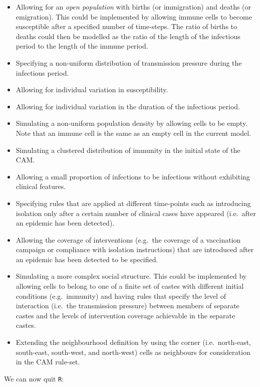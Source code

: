 \documentclass[12pt,a4paper]{book}
\theoremstyle{definition}
\theoremstyle{definition}
\theoremstyle{definition}
\theoremstyle{remark}
\begin{document}
\begin{itemize}
\item
  Allowing for an \emph{open population} with births (or immigration)
  and deaths (or emigration). This could be implemented by allowing
  immune cells to become susceptible after a specified number of
  time-steps. The ratio of births to deaths could then be modelled as
  the ratio of the length of the infectious period to the length of the
  immune period.
\item
  Specifying a non-uniform distribution of transmission pressure during
  the infectious period.
\item
  Allowing for individual variation in susceptibility.
\item
  Allowing for individual variation in the duration of the infectious
  period.
\item
  Simulating a non-uniform population density by allowing cells to be
  empty. Note that an immune cell is the same as an empty cell in the
  current model.
\item
  Simulating a clustered distribution of immunity in the initial state
  of the CAM.
\item
  Allowing a small proportion of infections to be infectious without
  exhibiting clinical features.
\item
  Specifying rules that are applied at different time-points such as
  introducing isolation only after a certain number of clinical cases
  have appeared (i.e.~after an epidemic has been detected).
\item
  Allowing the coverage of interventions (e.g.~the coverage of a
  vaccination campaign or compliance with isolation instructions) that
  are introduced after an epidemic has been detected to be specified.
\item
  Simulating a more complex social structure. This could be implemented
  by allowing cells to belong to one of a finite set of castes with
  different initial conditions (e.g.~immunity) and having rules that
  specify the level of interaction (i.e.~the transmission pressure)
  between members of separate castes and the levels of intervention
  coverage achievable in the separate castes.
\item
  Extending the neighbourhood definition by using the corner
  (i.e.~north-east, south-east, south-west, and north-west) cells as
  neighbours for consideration in the CAM rule-set.
\end{itemize}

We can now quit \texttt{R}:
\end{document}
